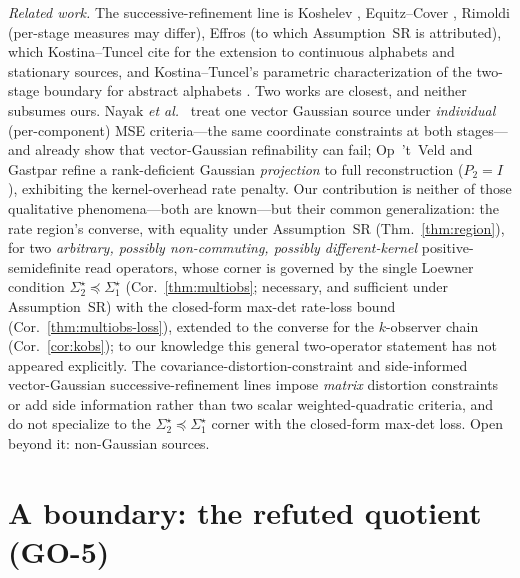 \documentclass[11pt]{article}
\theoremstyle{definition}
\theoremstyle{remark}
\begin{document}
\emph{Related work.} The successive-refinement line is Koshelev \cite{koshelev},
Equitz--Cover \cite{equitzcover}, Rimoldi \cite{rimoldi} (per-stage measures may
differ), Effros \cite{effros} (to which Assumption~SR is attributed), which
Kostina--Tuncel cite for the extension to continuous alphabets and stationary sources, and
Kostina--Tuncel's parametric characterization of the two-stage boundary for abstract
alphabets \cite{kostinatuncel}. Two works are
closest, and neither subsumes ours. Nayak \emph{et al.}~\cite{nayaktuncel} treat one
vector Gaussian source under \emph{individual} (per-component) MSE criteria---the same
coordinate constraints at both stages---and already show that vector-Gaussian
refinability can fail; Op~'t~Veld and Gastpar \cite{optveld} refine a rank-deficient
Gaussian \emph{projection} to full reconstruction ($P_2=I$), exhibiting the
kernel-overhead rate penalty. Our contribution is neither of those qualitative
phenomena---both are known---but their common generalization: the rate region's
converse, with equality under Assumption~SR (Thm.~\ref{thm:region}), for two \emph{arbitrary, possibly non-commuting, possibly
different-kernel} positive-semidefinite read operators, whose corner is governed by the
single Loewner condition $\Sigma_2^\star\preceq\Sigma_1^\star$ (Cor.~\ref{thm:multiobs};
necessary, and sufficient under Assumption~SR) with the closed-form max-det rate-loss bound
(Cor.~\ref{thm:multiobs-loss}), extended to the converse for the $k$-observer chain
(Cor.~\ref{cor:kobs}); to our knowledge this general two-operator statement has not
appeared explicitly. The covariance-distortion-constraint and side-informed vector-Gaussian
successive-refinement lines \cite{xuSR,zahedi} impose \emph{matrix} distortion constraints
or add side information rather than two scalar weighted-quadratic criteria, and do not
specialize to the $\Sigma_2^\star\preceq\Sigma_1^\star$ corner with the closed-form max-det
loss. Open beyond it: non-Gaussian sources.

\section{A boundary: the refuted quotient (GO-5)}\label{sec:boundary}
\end{document}
